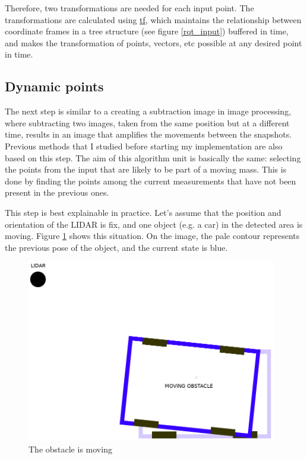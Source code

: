 Therefore, two transformations are needed for each input point. The transformations are calculated using \href{http://wiki.ros.org/tf}{tf}, which maintains the relationship between coordinate frames in a tree structure (see figure \ref{rqt_input}) buffered in time, and makes the transformation of points, vectors, etc possible at any desired point in time.

\subsection{Dynamic points}
\label{chap:dynamic_points}
The next step is similar to a creating a subtraction image in image processing, where subtracting two images, taken from the same position but at a different time, results in an image that amplifies the movements between the snapshots. Previous methods\cite{RealTimeDynamicObjectDetection} that I studied before starting my implementation are also based on this step. The aim of this algorithm unit is basically the same: selecting the points from the input that are likely to be part of a moving mass. This is done by finding the points among the current measurements that have not been present in the previous ones.

This step is best explainable in practice. Let's assume that the position and orientation of the LIDAR is fix, and one object (e.g. a car) in the detected area is moving. Figure \ref{obstacle_movement} shows this situation. On the image, the pale contour represents the previous pose of the object, and the current state is blue.

\begin{figure}[!ht]
    \centering
    \includegraphics[height=80mm]{figures/raw/obstacle_movement.png}
    \caption{The obstacle is moving}
    \label{obstacle_movement}
\end{figure}

